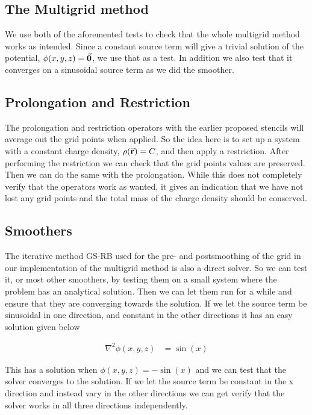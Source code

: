 \subsection{The Multigrid method}
	We use both of the aforemented tests to check that the whole multigrid method
	works as intended. Since a constant source term will give a trivial solution of
	the potential, \(\phi(x,y,z) = \va{0}\), we use that as a test. In addition we
	also test that it converges on a sinusoidal source term as we did the smoother.

\subsection{Prolongation and Restriction}


	The prolongation and restriction operators with the earlier proposed stencils
 	will average out the grid points when applied. So the idea here is to set up a
 	system with a constant charge density, \(\rho(\va{r}) = C\), and then apply a
	restriction. After performing the restriction we can check that the grid points
	values are preserved. Then we can do the same with the prolongation. While this
	does not completely verify that the operators work as wanted, it gives an indication
	that we have not lost any grid points and the total mass of the charge density should be conserved.

\subsection{Smoothers}

	The iterative method GS-RB used for the pre- and postsmoothing of the grid in
	our implementation of the multigrid method is also a direct solver.
	So we can test it, or most other smoothers, by testing them on a small system
	where the problem has an analytical solution. Then we can let them run for a
	while and ensure that they are converging towards the solution. If we let
	the source term be sinusoidal in one direction, and constant in the other
	directions it has an easy solution given below

	\begin{align}
		\nabla^2 \phi(x,y,z) &= \sin(x)
	\end{align}

	This has a solution when \(\phi(x,y,z) = -\sin(x)\) and we can test that the
	solver converges to the solution. If we let the source term be constant in the
	x direction and instead vary in the other directions we can get verify that the
	solver works in all three directions independently.

